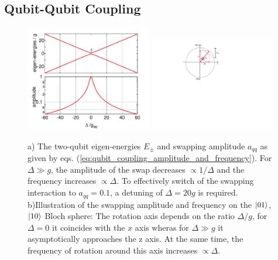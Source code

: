 \subsection{Qubit-Qubit Coupling}

\begin{figure}[hb!]
	\centering
	\includegraphics[width=0.49\textwidth]{./material/mathematica/qubit_qubit_coupling}
	\includegraphics[width=0.49\textwidth]{./material/figures/introduction/bloch_sphere_coupling_illustration}
	\caption[]{a) The two-qubit eigen-energies $E_\pm$ and swapping amplitude $a_{qq}$ as given by eqs. (\ref{eq:qubit_coupling_amplitude_and_frequency}). For $\Delta \gg g$, the amplitude of the swap decreases $\propto 1/\Delta$ and the frequency increases $\propto \Delta$. To effectively switch of the swapping interaction to $a_{qq}=0.1$, a detuning of $\Delta = 20 g$ is required. b)Illustration of the swapping amplitude and frequency on the $\left| 01 \right>$,$\left| 10 \right>$ Bloch sphere: The rotation axis depends on the ratio $\Delta/g$, for $\Delta=0$ it coincides with the $x$ axis wheras for $\Delta \gg g$ it asymptotically approaches the z axis. At the same time, the frequency of rotation around this axis increases $\propto \Delta$. }
	\label{fig:qubit_coupling_amplitude_and_frequency}
\end{figure}

